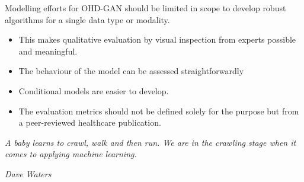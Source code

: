 \footnotesize
{}
\begin{tcolorbox}[arc=0mm, 
    colback=cadmiumgreen!10!white, 
    coltext=cadmiumgreen!90!black,  
    colframe=cadmiumgreen!90!black,
    colbacktitle=cadmiumgreen!80,
    leftrule=3mm,
    rightrule=0mm, 
    toprule=0mm, 
    bottomrule=0mm, 
    box align=top]

Modelling efforts for OHD-GAN should be limited in scope to develop robust algorithms for a single data type or modality.
\begin{itemize}
    \item This makes qualitative evaluation by visual inspection from experts possible and meaningful.
    \item The behaviour of the model can be assessed straightforwardly
    \item Conditional models are easier to develop.
    \item The evaluation metrics should not be defined solely for the purpose but from a peer-reviewed healthcare publication.
\end{itemize}

\end{tcolorbox}
\hfill
\begin{tcolorbox}[tcbox width=auto, 
    arc=0mm, 
    colback=white, 
    coltext=cadmiumgreen, 
    boxrule=0pt, 
    colframe=white,
    box align=top]
    
\epigraph{\textit{A baby learns to crawl, walk and then run.  We are in the crawling stage when it comes to applying machine learning.}}{\textit{Dave Waters}}

\end{tcolorbox}
\normalsize